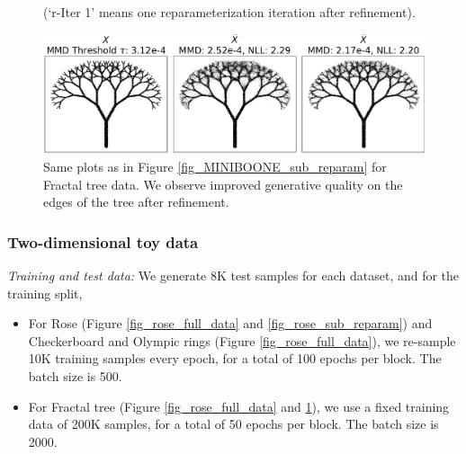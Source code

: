 \documentclass{article}
\theoremstyle{remark}
\theoremstyle{plain}
\newcommand{\revold}[1]{{\color{black}#1}}
\begin{document}
{\begin{figure}[!t]
\begin{minipage}{0.49\textwidth}
{    (`r-Iter 1' means one reparameterization iteration after refinement).}
    \end{minipage}
    \hfill
    \begin{minipage}{0.49\textwidth}
    \includegraphics[width=\textwidth]{Img_tree_true_vs_gen_together.png}
    \end{minipage}
    \caption{
    Same plots as in Figure \ref{fig_MINIBOONE_sub_reparam} for Fractal tree data.
    We observe improved generative quality on the edges of the tree after refinement.
    }
    \label{fig_tree_sub_reparam}
\end{figure}



\subsubsection{Two-dimensional toy data}\label{app:2d_toy}

\noindent
\textit{Training and test data: }
    We generate \revold{8K} test samples for each dataset,
    and for the training split,
    \begin{itemize}
        \item For Rose (Figure \ref{fig_rose_full_data} and \ref{fig_rose_sub_reparam}) and Checkerboard and Olympic rings (Figure \ref{fig_rose_full_data}), we re-sample 10K training samples every epoch, for a total of 100 epochs per block. The batch size is 500.
        \item For Fractal tree (Figure \ref{fig_rose_full_data} and \ref{fig_tree_sub_reparam}), we use a fixed training data of 200K samples, for a total of 50 epochs per block. The batch size is 2000.
    \end{itemize}

}
\end{document}
